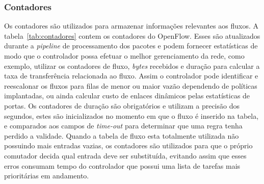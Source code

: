 
\subsubsection{Contadores}
Os contadores são utilizados para armazenar informações relevantes aos fluxos. A tabela~\ref{tab:contadores} contem os contadores do OpenFlow. Esses são atualizados durante a \textit{pipeline} de processamento dos pacotes e podem fornecer estatísticas de modo que o controlador possa efetuar o melhor gerenciamento da rede, como exemplo, utilizar os contadores de fluxo, \textit{bytes} recebidos e duração para calcular a taxa de transferência relacionada ao fluxo. Assim o controlador pode identificar e reescalonar os fluxos para filas de menor ou maior vazão dependendo de políticas implantadas, ou ainda calcular custo de enlaces dinâmicos pelas estatísticas de portas. Os contadores de duração são obrigatórios e utilizam a precisão dos segundos, estes  são inicializados no momento em que o fluxo é inserido na tabela, e comparados aos campos de \textit{time-out} para determinar que uma regra tenha perdido a validade. Quando a tabela de fluxo esta totalmente utilizada não possuindo mais entradas vazias, os contadores são utilizados para que o próprio comutador decida qual entrada deve ser substituída, evitando assim que esses erros consumam tempo do controlador que possui uma lista de tarefas mais prioritárias em andamento.


